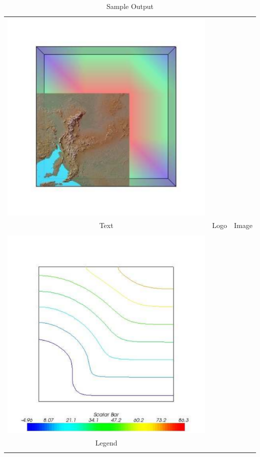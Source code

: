 \begin{table}[t]
\begin{tabular}{c c c}
\includegraphics[width=\thumbnailwidth]{figures/Image} \\ 
Text & Logo & Image \\ \\
\includegraphics[width=\thumbnailwidth]{figures/Legend} \\
Legend \\ \\
\end{tabular}
\caption{Sample Output}
\end{table}


